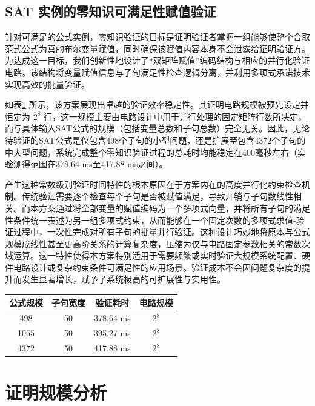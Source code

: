 \subsection{SAT 实例的零知识可满足性赋值验证}

针对可满足的公式实例，零知识验证的目标是证明验证者掌握一组能够使整个合取范式公式为真的布尔变量赋值，同时确保该赋值内容本身不会泄露给证明验证方。为达成这一目标，我们创新性地设计了“双矩阵赋值”编码结构与相应的并行化验证电路。该结构将变量赋值信息与子句满足性检查逻辑分离，并利用多项式承诺技术实现高效的批量验证。

如表\ref{tab:sat-verify} 所示，该方案展现出卓越的验证效率稳定性。其证明电路规模被预先设定并恒定为 $2^8$ 行，这一规模主要由电路设计中用于并行处理的固定矩阵行数所决定，而与具体输入SAT公式的规模（包括变量总数和子句总数）完全无关。因此，无论待验证的SAT公式是仅包含498个子句的小型问题，还是扩展至包含4372个子句的中大型问题，系统完成整个零知识验证过程的总耗时均能稳定在400毫秒左右（实验测得范围在378.64 ms至417.88 ms之间）。

产生这种常数级别验证时间特性的根本原因在于方案内在的高度并行化约束检查机制。传统验证需要逐个检查每个子句是否被赋值满足，导致开销与子句数线性相关。而本方案通过将全部变量的赋值编码为一个多项式向量，并将所有子句的满足性条件统一表述为另一组多项式约束，从而能够在一个固定次数的多项式求值-验证过程中，一次性完成对所有子句的批量并行验证。这种设计巧妙地将原本与公式规模成线性甚至更高阶关系的计算复杂度，压缩为仅与电路固定参数相关的常数次域运算。这一特性使得本方案特别适用于需要频繁或实时验证大规模系统配置、硬件电路设计或复杂约束条件可满足性的应用场景。验证成本不会因问题复杂度的提升而发生显著增长，赋予了系统极高的可扩展性与实用性。

\begin{table}[htbp]
\centering
{}
\label{tab:sat-verify}
\begin{tabular}{cccc}
\toprule
\textbf{公式规模} & \textbf{子句宽度} & \textbf{验证耗时} & \textbf{电路规模} \\
\midrule
498 & 50 & 378.64 ms & $2^{8}$ \\
1065 & 50 & 395.27 ms & $2^{8}$ \\
4372 & 50 & 417.88 ms & $2^{8}$ \\
\bottomrule
\end{tabular}
\end{table}

\section{证明规模分析}

